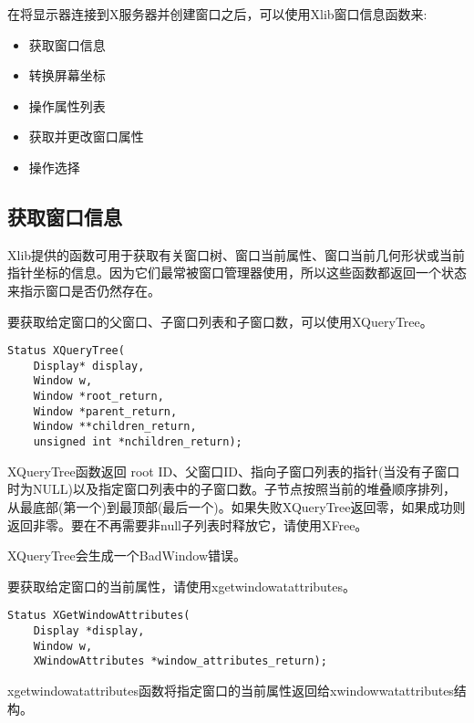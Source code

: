 在将显示器连接到X服务器并创建窗口之后，可以使用Xlib窗口信息函数来:

\begin{itemize}
	\item 获取窗口信息
	\item 转换屏幕坐标
	\item 操作属性列表
	\item 获取并更改窗口属性
	\item 操作选择
\end{itemize}

\subsection{获取窗口信息}

Xlib提供的函数可用于获取有关窗口树、窗口当前属性、窗口当前几何形状或当前指针坐标的信息。因为它们最常被窗口管理器使用，所以这些函数都返回一个状态来指示窗口是否仍然存在。

要获取给定窗口的父窗口、子窗口列表和子窗口数，可以使用XQueryTree。

\begin{lstlisting}
Status XQueryTree(
	Display* display,
	Window w,
	Window *root_return,
	Window *parent_return,
	Window **children_return,
	unsigned int *nchildren_return);
\end{lstlisting}

XQueryTree函数返回 root ID、父窗口ID、指向子窗口列表的指针(当没有子窗口时为NULL)以及指定窗口列表中的子窗口数。子节点按照当前的堆叠顺序排列，从最底部(第一个)到最顶部(最后一个)。如果失败XQueryTree返回零，如果成功则返回非零。要在不再需要非null子列表时释放它，请使用XFree。

XQueryTree会生成一个BadWindow错误。

要获取给定窗口的当前属性，请使用xgetwindowatattributes。

\begin{lstlisting}
Status XGetWindowAttributes(
	Display *display,
	Window w,
	XWindowAttributes *window_attributes_return);
\end{lstlisting}

xgetwindowatattributes函数将指定窗口的当前属性返回给xwindowwatattributes结构。

